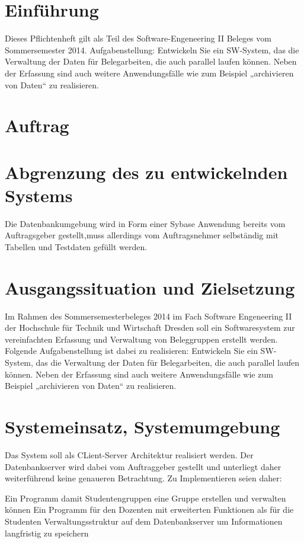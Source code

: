 \part{Einführung} 

Dieses Pflichtenheft gilt als Teil des Software-Engeneering II Beleges vom Sommersemester 2014.
Aufgabenstellung:
Entwickeln  Sie ein SW-System, das die Verwaltung der Daten für Belegarbeiten, die auch parallel laufen können. Neben der Erfassung sind auch weitere Anwendungsfälle wie zum Beispiel „archivieren von Daten“ zu realisieren.


\part{Auftrag}


\part{Abgrenzung des zu entwickelnden Systems}
Die Datenbankumgebung wird in Form einer Sybase Anwendung bereits vom Auftragsgeber gestellt,muss allerdings vom Auftragsnehmer selbständig mit Tabellen und Testdaten gefüllt werden.
 
\part{Ausgangssituation und Zielsetzung}
Im Rahmen des Sommersemesterbeleges 2014 im Fach Software Engeneering II der Hochschule für Technik und Wirtschaft Dresden soll ein Softwaresystem zur vereinfachten Erfassung und Verwaltung von Beleggruppen erstellt werden.
Folgende Aufgabenstellung ist dabei zu realisieren:
Entwickeln  Sie ein SW-System, das die Verwaltung der Daten für Belegarbeiten, die auch parallel laufen können. Neben der Erfassung sind auch weitere Anwendungsfälle wie zum Beispiel „archivieren von Daten“ zu realisieren.


\part{Systemeinsatz, Systemumgebung}
Das System soll als CLient-Server Architektur realisiert werden. Der Datenbankserver wird dabei vom Auftraggeber gestellt und unterliegt daher weiterführend keine genaueren Betrachtung. Zu Implementieren seien daher:
\begin{itemize}
Ein Programm damit Studentengruppen eine Gruppe erstellen und verwalten können
Ein Programm für den Dozenten mit erweiterten Funktionen als für die Studenten
Verwaltungsstruktur auf dem Datenbankserver um Informationen langfristig zu speichern
\end{itemize}


